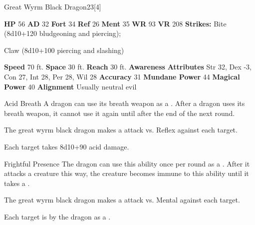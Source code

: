   \begin{monsubsection}{Great Wyrm Black Dragon}{23}[4]
    \vspace{-1em}\vspace{-1em}
    \vspace{0em}

    
    

    \begin{spellcontent}
      \begin{spelltargetinginfo}
        \pari \textbf{HP} 56 \monsep
          \textbf{AD} 32 \monsep
          \textbf{Fort} 34 \monsep
          \textbf{Ref} 26 \monsep
          \textbf{Ment} 35
        \pari \textbf{WR} 93 \monsep
        \textbf{VR} 208
        \pari \textbf{Strikes:}
            Bite  (8d10+120 bludgeoning and piercing);
\par Claw  (8d10+100 piercing and slashing)
      \end{spelltargetinginfo}
    \end{spellcontent}
    \begin{monsterfooter}
      \pari \textbf{Speed} 70 ft. \monsep
        \textbf{Space} 30 ft. \monsep
        \textbf{Reach} 30 ft.
      \pari \textbf{Awareness} 
      \pari \textbf{Attributes}
        Str 32, Dex -3,
        Con 27, Int 28,
        Per 28, Wil 28
      \pari \textbf{Accuracy} 31 \monsep
        \textbf{Mundane Power} 44 \monsep
      \textbf{Magical Power} 40
      \pari \textbf{Alignment} Usually neutral evil
    \end{monsterfooter}
  \end{monsubsection}
  \begin{freeability}{Acid Breath}
      A dragon can use its breath weapon as a .
      After a dragon uses its breath weapon, it cannot use it again until after the end of the next round.
      \par The great wyrm black dragon makes a  attack
        vs. Reflex against each target.
    
    \hit Each target takes 8d10+90 acid damage.
    \end{freeability}
  

    \begin{freeability}{Frightful Presence}
      The dragon can use this ability once per round as a .
      After it attacks a creature this way, the creature becomes immune to this ability until it takes a .
      \par The great wyrm black dragon makes a  attack
        vs. Mental against each target.
    
    \hit Each target is  by the dragon as a .
    \end{freeability}
  
